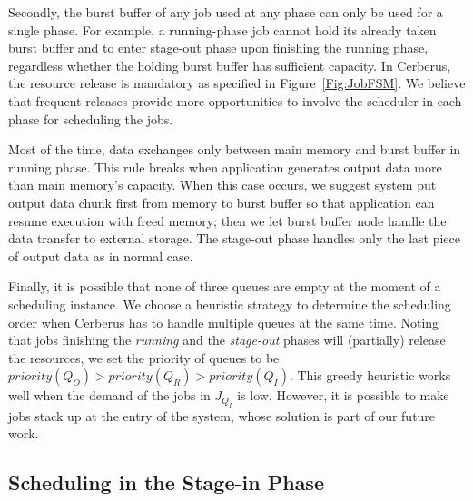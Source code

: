 Secondly, the burst buffer of any job used at any phase can only be used for a single phase.
For example, a running-phase job cannot hold its already taken burst buffer
and to enter stage-out phase upon finishing the running phase,
regardless whether the holding burst buffer has sufficient capacity.
In Cerberus, the resource release is mandatory as specified in Figure~\ref{Fig:JobFSM}.
We believe that frequent releases provide more opportunities to involve the scheduler in each phase for scheduling the jobs.

Most of the time, data exchanges only between main memory and burst buffer in running phase.
This rule breaks when application generates output data more than main memory's capacity.
When this case occurs, we suggest system put output data chunk first from memory to burst buffer
so that application can resume execution with freed memory;
then we let burst buffer node handle the data transfer to external storage.
The stage-out phase handles only the last piece of output data as in normal case.

Finally, it is possible that none of three queues are empty at the moment of a scheduling instance.
We choose a heuristic strategy to determine the scheduling order when
Cerberus has to handle multiple queues at the same time.
Noting that jobs finishing the \textit{running} and the \textit{stage-out} phases will
(partially) release the resources,
we set the priority of queues to be $priority(Q_O) > priority(Q_R) > priority(Q_I)$.
This greedy heuristic works well when the demand of the jobs in $J_{Q_I}$ is low.
However, it is possible to make jobs stack up at the entry of the system,
whose solution is part of our future work.


\subsection{Scheduling in the Stage-in Phase}
\label{SubSec:OptStageIn}

